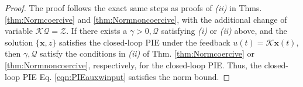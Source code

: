 \documentclass[letterpaper, 10 pt, conference]{ieeeconf}
\newcommand{\mcl}[1]{\mathcal{#1}}
\newcommand{\mbf}[1]{\mathbf{#1}}
\theoremstyle{definition}
\begin{document}
\begin{proof}
The proof follows the exact same steps as proofs of \textit{(ii)} in Thms. \ref{thm:Normcoercive} and \ref{thm:Normnoncoercive}, with the additional change of variable $\mcl K\mcl Q = \mcl Z$. If there exists a $\gamma>0, \mcl Q$ satisfying \textit{(i)} or \textit{(ii)} above, and the solution $\{\mbf x, z\}$ satisfies the closed-loop PIE under the feedback $u(t)=\mcl K\mbf x(t)$, then $\gamma, \mcl Q$ satisfy the conditions in \textit{(ii)} of Thm. \ref{thm:Normcoercive} or \ref{thm:Normnoncoercive}, respectively, for the closed-loop PIE. Thus, the closed-loop PIE Eq. \eqref{eqn:PIEauxwinput} satisfies the norm bound.









\end{proof}
\end{document}
